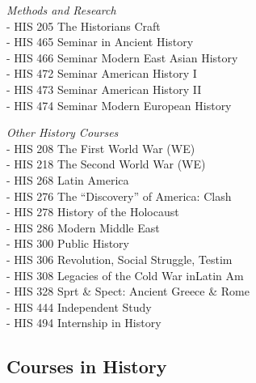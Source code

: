 \documentclass[
  letterpaper,
]{scrbook}
\begin{document}
\emph{Methods and Research}\\
- HIS 205 The Historians Craft\\
- HIS 465 Seminar in Ancient History\\
- HIS 466 Seminar Modern East Asian History\\
- HIS 472 Seminar American History I\\
- HIS 473 Seminar American History II\\
- HIS 474 Seminar Modern European History

\emph{Other History Courses}\\
- HIS 208 The First World War (WE)\\
- HIS 218 The Second World War (WE)\\
- HIS 268 Latin America\\
- HIS 276 The ``Discovery'' of America: Clash\\
- HIS 278 History of the Holocaust\\
- HIS 286 Modern Middle East\\
- HIS 300 Public History\\
- HIS 306 Revolution, Social Struggle, Testim\\
- HIS 308 Legacies of the Cold War inLatin Am\\
- HIS 328 Sprt \& Spect: Ancient Greece \& Rome\\
- HIS 444 Independent Study\\
- HIS 494 Internship in History

\subsection{Courses in History}\label{courses-in-history}
\end{document}
